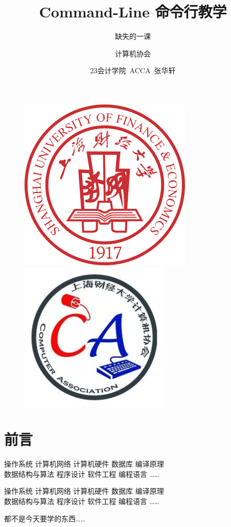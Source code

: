 \documentclass[UTF8, 16pt]{beamer}
\author[计算机协会] %
{
计算机协会
}
\title[Command-Line 命令行教学]{Command-Line 命令行教学}
\subtitle{缺失的一课}
\institute[SUFE]
{
上海财经大学
}
\date{23会计学院\ ACCA\ 张华轩}
\begin{document}
\begin{frame}[noframenumbering]
    \titlepage{}
    \vspace{-0.5cm}
    \begin{figure}[htpb]
        \begin{center}
            \includegraphics[width=0.19 \linewidth]{sufe_logo.png}
            \quad
            \includegraphics[width=0.19 \linewidth]{ca_logo.png}
        \end{center}
    \end{figure}
\end{frame}


\section{前言}
\begin{frame}
    \textcolor{sufered}{
        操作系统 \quad
        计算机网络 \quad
        计算机硬件 \quad
        数据库 \quad
        编译原理 \\
        数据结构与算法 \quad
        程序设计 \quad
        软件工程 \quad
        编程语言 \quad
        \dots\dots
    }
\end{frame}

\begin{frame}
    \textcolor{sufered}{
        操作系统 \quad
        计算机网络 \quad
        计算机硬件 \quad
        数据库 \quad
        编译原理 \\
        数据结构与算法 \quad
        程序设计 \quad
        软件工程 \quad
        编程语言 \quad
        \dots\dots
    }
    
    都不是今天要学的东西\dots\dots
\end{frame}
\end{document}
